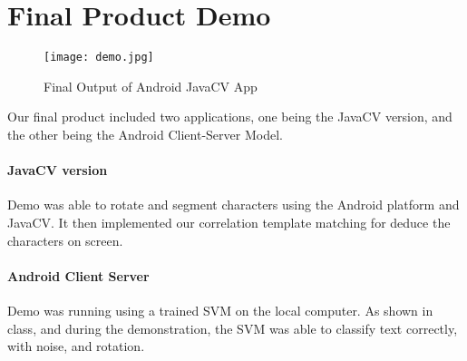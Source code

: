 \section{Final Product Demo}
\begin{figure}[h]
	\texttt{[image: demo.jpg]}\\
	\caption{Final Output of Android JavaCV App}
	\label{fig:demo}
\end{figure}

Our final product included two applications, one being the JavaCV version,
and the other being the Android Client-Server Model. 

\paragraph{JavaCV version} Demo was able to rotate and segment characters
using the Android platform and JavaCV. It then implemented our correlation template
matching for deduce the characters on screen.

\paragraph{Android Client Server} Demo was running using a trained SVM on
the local computer. As shown in class, and during the demonstration, the SVM
was able to classify text correctly, with noise, and rotation.

